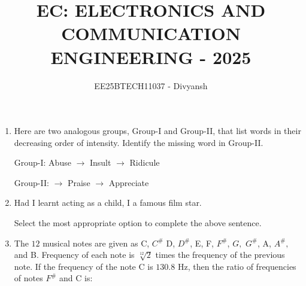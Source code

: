 \documentclass[journal,12pt,onecolumn]{IEEEtran}
\title{EC: ELECTRONICS AND COMMUNICATION ENGINEERING - 2025}
\author{EE25BTECH11037 - Divyansh}
\theoremstyle{remark}
\begin{document}
\maketitle
\begin{enumerate}

\item Here are two analogous groups, Group-I and Group-II, that list words in their decreasing order of intensity. Identify the missing word in Group-II. 

Group-I: Abuse $\rightarrow$ Insult $\rightarrow$ Ridicule 

Group-II: \underline{\hspace{2cm}} $\rightarrow$ Praise $\rightarrow$ Appreciate

\hfill{}

\begin{enumerate}
\end{enumerate}

\item Had I learnt acting as a child, I \underline{\hspace{2cm}} a famous film star. 

Select the most appropriate option to complete the above sentence.

\hfill{}
\begin{enumerate}
\end{enumerate}

\item The $12$ musical notes are given as C, $C^{\#}$ D, $D^{\#}$, E, F, $F^{\#}$, $G,$ $G^{\#}$, A, $A^{\#},$ and B. Frequency of each note is $\sqrt[12]{2}$ times the frequency of the previous note. If the frequency of the note C is $130.8$ Hz, then the ratio of frequencies of notes $F^{\#}$ and C is:

\hfill{}


\end{enumerate}
\end{document}
